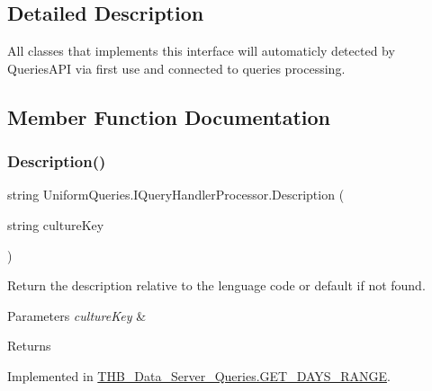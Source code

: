 \subsection{Detailed Description}
All classes that implements this interface will automaticly detected by Queries\+A\+PI via first use and connected to queries processing. 



\subsection{Member Function Documentation}
\mbox{\label{interface_uniform_queries_1_1_i_query_handler_processor_ae7323367177cd11c787d61029de5b044}} 
\subsubsection{\texorpdfstring{Description()}{Description()}}
{\footnotesize\ttfamily string Uniform\+Queries.\+I\+Query\+Handler\+Processor.\+Description (\begin{DoxyParamCaption}\item[{string}]{culture\+Key }\end{DoxyParamCaption})}



Return the description relative to the lenguage code or default if not found. 


\begin{DoxyParams}{Parameters}
{\em culture\+Key} & \\
\hline
\end{DoxyParams}
\begin{DoxyReturn}{Returns}

\end{DoxyReturn}


Implemented in \mbox{\hyperlink{class_t_h_b___data___server___queries_1_1_g_e_t___d_a_y_s___r_a_n_g_e_aa91ce7c90a325c70aab9aaf112fe49f3}{T\+H\+B\+\_\+\+Data\+\_\+\+Server\+\_\+\+Queries.\+G\+E\+T\+\_\+\+D\+A\+Y\+S\+\_\+\+R\+A\+N\+GE}}.

\mbox{\label{interface_uniform_queries_1_1_i_query_handler_processor_a60538b1b29c5d1d3bc67db28a265677a}} 
